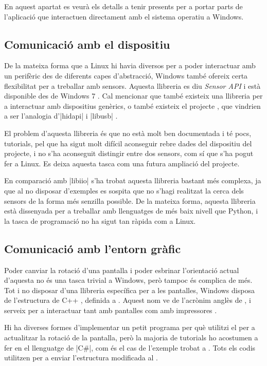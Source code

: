 En aquest apartat es veurà els detalls a tenir presents per a portar parts
de l'aplicació que interactuen directament amb el sistema operatiu a Windows.

\subsection{Comunicació amb el dispositiu}

De la mateixa forma que a Linux hi havia diversos  per a poder
interactuar amb un perifèric des de diferents capes d'abstracció, Windows també
ofereix certa flexibilitat per a treballar amb sensors. Aquesta llibreria es diu
\emph{Sensor API} i està disponible des de Windows 7 \cite{SensorMsft}.
Cal mencionar que també existeix una llibreria per a interactuar amb dispositius
 genèrics, o també existeix el projecte , que
vindrien a ser l'analogia d'\ord|hidapi| i \ord|libusb| \cite{SensorHidMsft}.

El problem d'aquesta llibreria és que no està molt ben documentada i té pocs,
tutorials, pel que ha sigut molt difícil aconseguir rebre dades del dispositiu
del projecte, i no s'ha aconseguit distingir entre dos sensors, com sí que
s'ha pogut fer a Linux. Es deixa aquesta tasca com una futura ampliació del
projecte.

En comparació amb \ord|libiio| s'ha trobat aquesta llibreria bastant més
complexa, ja que al no disposar d'exemples es sospita que no s'hagi realitzat
la cerca dels sensors de la forma més senzilla possible. De la mateixa forma,
aquesta llibreria està dissenyada per a treballar amb llenguatges de més baix
nivell que Python, i la tasca de programació no ha sigut tan ràpida com a Linux.

\subsection{Comunicació amb l'entorn gràfic}

Poder canviar la rotació d'una pantalla i poder esbrinar l'orientació actual
d'aquesta no és una tasca trivial a Windows, però tampoc és complica de més.
Tot i no disposar d'una llibreria específica per a les pantalles, Windows
disposa de l'estructura de C++ , definida a .
Aquest nom ve de l'acrònim anglès de , i serveix per a
interactuar tant amb pantalles com amb impressores \cite{WinDevMode}.

Hi ha diverses formes d'implementar un petit programa per què utilitzi el
 per a actualitzar la rotació de la pantalla, però la majoria
de tutorials ho acostumen a fer en el llenguatge de \ord|C#|, com és el cas
de l'exemple trobat a \cite{WinRotateOnline}. Tots els codis utilitzen
 per a enviar l'estructura modificada al .

